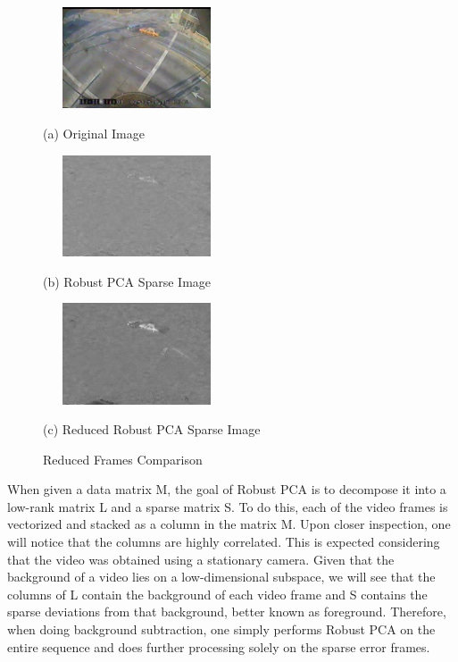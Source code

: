 \documentclass{article}
\begin{document}
\begin{figure}[htb]

\begin{minipage}[b]{0.3333\linewidth}
  \centering
  \centerline{\includegraphics[width=5.55cm, height=3cm]{Imgs/Orig_1228021540.jpg}}
  \centerline{(a) Original Image}\medskip
\end{minipage}
%
\begin{minipage}[b]{0.3333\linewidth}
  \centering
  \centerline{\includegraphics[width=5.55cm, height=3cm]{Imgs/SP_IMG_R_1228021540.jpg}}
  \centerline{(b) Robust PCA Sparse Image}\medskip
\end{minipage}
\hfill
\begin{minipage}[b]{0.3333\linewidth}
  \centering
  \centerline{\includegraphics[width=5.55cm, height = 3cm]{Imgs/SP_IMG_Reduced_1228021540.jpg}}
  \centerline{(c) Reduced Robust PCA Sparse Image}\medskip
\end{minipage}
%
\caption{Reduced Frames Comparison}
\label{fig:reduceComp}
%
\end{figure}


When given a data matrix M, the goal of Robust PCA is to decompose it into a low-rank matrix L and a sparse matrix S. To do this, each of the video frames is vectorized and stacked as a column in the matrix M. Upon closer inspection, one will notice that the columns are highly correlated. This is expected considering that the video was obtained using a stationary camera. Given that the background of a video lies on a low-dimensional subspace, we will see that the columns of L contain the background of each video frame and S contains the sparse deviations from that background, better known as foreground. Therefore, when doing background subtraction, one simply performs Robust PCA on the entire sequence and does further processing solely on the sparse error frames.
\end{document}
